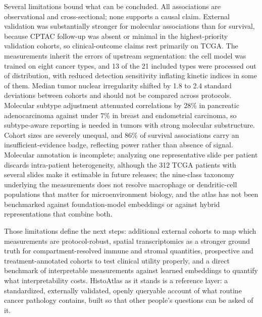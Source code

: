 Several limitations bound what can be concluded. All associations are
observational and cross-sectional; none supports a causal claim. External
validation was substantially stronger for molecular associations than for
survival, because CPTAC follow-up was absent or minimal in the highest-priority
validation cohorts, so clinical-outcome claims rest primarily on TCGA. The
measurements inherit the errors of upstream segmentation: the cell model was
trained on eight cancer types, and 13 of the 21 included types were processed
out of distribution, with reduced detection sensitivity inflating kinetic indices
in some of them. Median tumor nuclear irregularity shifted by 1.8 to 2.4
standard deviations between cohorts and should not be compared across protocols.
Molecular subtype adjustment attenuated correlations by 28\% in pancreatic
adenocarcinoma against under 7\% in breast and endometrial carcinoma, so
subtype-aware reporting is needed in tumors with strong molecular substructure.
Cohort sizes are severely unequal, and 86\% of survival associations carry an
insufficient-evidence badge, reflecting power rather than absence of signal.
Molecular annotation is incomplete; analyzing one representative slide per
patient discards intra-patient heterogeneity, although the 312 TCGA patients
with several slides make it estimable in future releases; the nine-class taxonomy underlying the
measurements does not resolve macrophage or dendritic-cell populations that
matter for microenvironment biology, and the atlas has
not been benchmarked against foundation-model embeddings or against hybrid
representations that combine both.

Those limitations define the next steps: additional external cohorts to map
which measurements are protocol-robust, spatial transcriptomics as a stronger
ground truth for compartment-resolved immune and stromal quantities, prospective
and treatment-annotated cohorts to test clinical utility properly, and a direct
benchmark of interpretable measurements against learned embeddings to quantify
what interpretability costs. HistoAtlas as it stands is a reference layer: a
standardized, externally validated, openly queryable account of what routine
cancer pathology contains, built so that other people's questions can be asked
of it.
